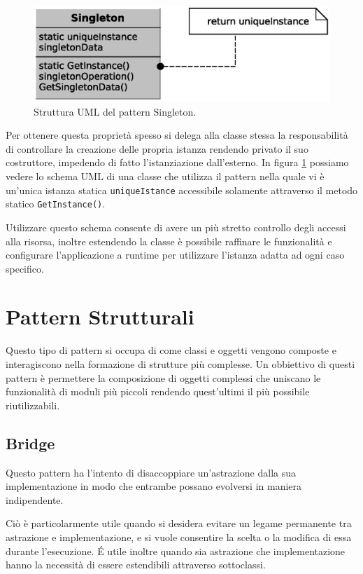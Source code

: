 \begin{figure}
\begin{center}
\includegraphics[width=12cm]{Immagini/SingletonPattern}
\caption{Struttura UML del pattern Singleton.\label{f:singletonpattern}}
\end{center} 
\end{figure}

Per ottenere questa propriet\`a spesso si delega alla classe stessa la responsabilit\`a di controllare la creazione delle propria istanza rendendo privato il suo costruttore, impedendo di fatto l'istanziazione dall'esterno. In figura \ref{f:singletonpattern} possiamo vedere lo schema \ac{UML} di una classe che utilizza il pattern nella quale vi \`e un'unica istanza statica \texttt{uniqueIstance} accessibile solamente attraverso il metodo statico \texttt{GetInstance()}. 

Utilizzare questo schema consente di avere un pi\`u stretto controllo degli accessi alla risorsa, inoltre estendendo la classe \`e possibile raffinare le funzionalit\`a e configurare l'applicazione a runtime per utilizzare l'istanza adatta ad ogni caso specifico.

\section{Pattern Strutturali}
Questo tipo di pattern si occupa di come classi e oggetti vengono composte e interagiscono nella formazione di strutture pi\`u complesse. 
Un obbiettivo di questi pattern \`e permettere la composizione di oggetti complessi che uniscano le funzionalit\`a di moduli pi\`u piccoli rendendo quest'ultimi il pi\`u possibile riutilizzabili.

\subsection{Bridge}
\label{sub:bridge}
Questo pattern ha l'intento di disaccoppiare un'astrazione dalla sua implementazione in modo che entrambe possano evolversi in maniera indipendente.

Ci\`o \`e particolarmente utile quando si desidera evitare un legame permanente tra astrazione e implementazione, e si vuole consentire la scelta o la modifica di essa durante l'esecuzione. \'E utile inoltre quando sia astrazione che implementazione hanno la necessit\`a di essere estendibili attraverso sottoclassi. 

